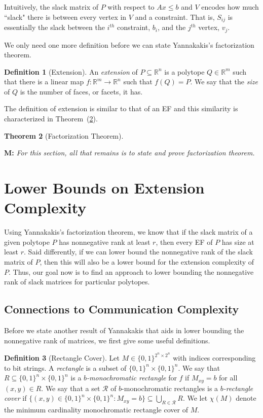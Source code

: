 \documentclass{article}
\newtheorem{theorem}{\sc Theorem}
\theoremstyle{definition}
\newtheorem{definition}[theorem]{Definition}
\theoremstyle{remark}
\newcommand{\bits}{\{0,1\}}
\renewcommand{\R}{\mathbb{R}}
\newcommand{\mnote}[1]{{\color{blue}\noindent\textbf{M: }\marginpar{****}\textit{{#1}}}}
\begin{document}
Intuitively, the slack matrix of $P$ with respect to $Ax \le b$ and $V$ encodes how much ``slack" there is between every vertex in $V$ and a constraint. That is, $S_{ij}$ is essentially the slack between the $i^{th}$ constraint, $b_i$, and the $j^{th}$ vertex, $v_j$.

We only need one more definition before we can state Yannakakis's factorization theorem. 

\begin{definition}[Extension]
An \emph{extension} of $P \subseteq \R^n$ is a polytope $Q \in \R^m$ such that there is a linear map $f : \R^m \to \R^n$ such that $f(Q) = P$. We say that the \emph{size} of $Q$ is the number of faces, or facets, it has.
\end{definition}

The definition of extension is similar to that of an EF and this similarity is characterized in Theorem~(\ref{theor:factor}).

\begin{theorem}[Factorization Theorem]\label{theor:factor}
\end{theorem}

\mnote{For this section, all that remains is to state and prove factorization theorem.}

\section{Lower Bounds on Extension Complexity}

Using Yannakakis's factorization theorem, we know that if the slack matrix of a given polytope $P$ has nonnegative rank at least $r$, then every EF of $P$ has size at least $r$. Said differently, if we can lower bound the nonnegative rank of the slack matrix of $P$, then this will also be a lower bound for the extension complexity of $P$. Thus, our goal now is to find an approach to lower bounding the nonnegative rank of slack matrices for particular polytopes. 

\subsection{Connections to Communication Complexity}\label{sec:theorem4}

Before we state another result of Yannakakis that aids in lower bounding the nonnegative rank of matrices, we first give some useful definitions.

\begin{definition}[Rectangle Cover]
Let $M \in \bits^{2^n \times 2^n}$ with indices corresponding to bit strings. A \emph{rectangle} is a subset of $\bits^n \times \bits^n$. We say that $R \subseteq \bits^n \times \bits^n$ is a \emph{$b$-monochromatic rectangle} for $f$ if $M_{xy} = b$ for all $(x,y) \in R$. We say that a set $\mathcal{R}$ of $b$-monochromatic rectangles is a \emph{$b$-rectangle cover} if $\{(x,y) \in \bits^n \times \bits^n : M_{xy} = b\} \subseteq \bigcup_{R \in \mathcal{R}} R$.  We let $\chi(M)$ denote the minimum cardinality monochromatic rectangle cover of $M$.
\end{definition}
\end{document}
